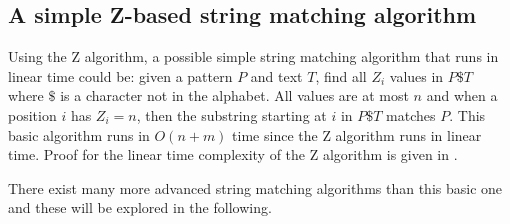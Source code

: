 \subsection{A simple Z-based string matching algorithm}

Using the Z algorithm, a possible simple string matching algorithm that runs in linear time could be: given a pattern $P$ and text $T$, find all $Z_i$ values in $P\$T$ where $\$$ is a character not in the alphabet. All values are at most $n$ and when a position $i$ has $Z_i=n$, then the substring starting at $i$ in $P\$T$ matches $P$. This basic algorithm runs in $O(n+m)$ time since the Z algorithm runs in linear time. Proof for the linear time complexity of the Z algorithm is given in \cite{Gusfield1997AlgorithmsOS}. 

There exist many more advanced string matching algorithms than this basic one and these will be explored in the following. 

